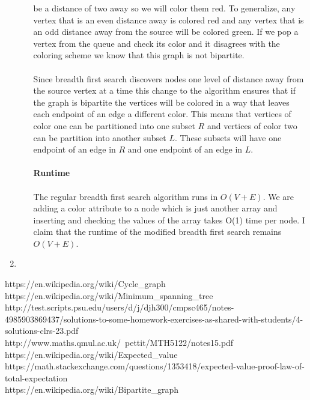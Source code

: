 \documentclass[12pt]{article}
\begin{document}
\begin{enumerate}
\begin{enumerate}
			be a distance of two away so we will color them red.  To generalize, any vertex that is an even distance away is colored red and any vertex that is an odd distance away from the source
			will be colored green.  If we pop a vertex from the queue and check its color and it disagrees with the coloring scheme we know that this graph is not bipartite.\\			
			\\
			Since breadth first search discovers nodes one level of distance away from the source vertex at a time this change to the algorithm ensures 
			that if the graph is bipartite the vertices will be colored in a way that leaves each endpoint of an edge a different color.
			This means that vertices of color one can be partitioned into one subset $R$ and vertices of color two can be partition into another subset $L$.  
			These subsets will have one endpoint of an edge in $R$ and one endpoint of an edge in $L$.\\
			\\
			\textbf{Runtime}\\
			\\
			The regular breadth first search algorithm runs in $O(V+E)$.  
			We are adding a color attribute to a node which is just another array and inserting and checking the values of the array takes O(1) time per node.  
			I claim that the runtime of the modified breadth first search remains $O(V+E)$.
		\end{enumerate}
		
		\item
	
\end{enumerate}

\begin{thebibliography}{10}
	 https://en.wikipedia.org/wiki/Cycle\_graph\\
	 https://en.wikipedia.org/wiki/Minimum\_spanning\_tree\\
	 http://test.scripts.psu.edu/users/d/j/djh300/cmpsc465/notes-4985903869437/solutions-to-some-homework-exercises-as-shared-with-students/4-solutions-clrs-23.pdf\\
	 http://www.maths.qmul.ac.uk/~pettit/MTH5122/notes15.pdf\\
	 https://en.wikipedia.org/wiki/Expected\_value\\
	 https://math.stackexchange.com/questions/1353418/expected-value-proof-law-of-total-expectation\\
	 https://en.wikipedia.org/wiki/Bipartite\_graph
\end{thebibliography}
\end{document}
